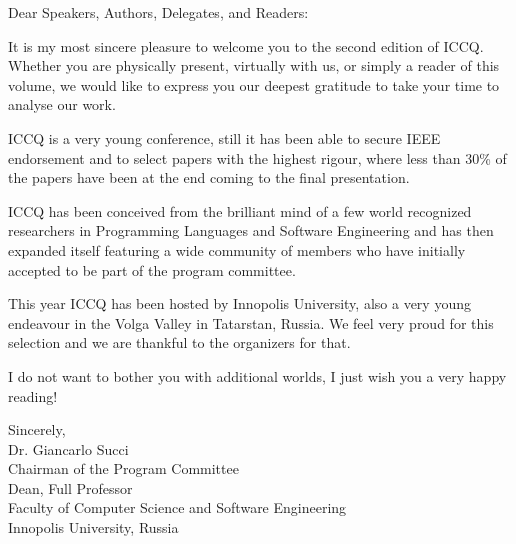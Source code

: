 
\cleardoublepage
{}

Dear Speakers, Authors, Delegates, and Readers:

It is my most sincere pleasure to welcome you to the second edition of ICCQ. Whether you are physically present, virtually with us, or simply a reader of this volume, we would like to express you our deepest gratitude to take your time to analyse our work.

ICCQ is a very young conference, still it has been able to secure IEEE endorsement and to select papers with the highest rigour, where less than 30\% of the papers have been at the end coming to the final presentation.

ICCQ has been conceived from the brilliant mind of a few world recognized researchers in Programming Languages and Software Engineering and has then expanded itself featuring a wide community of members who have initially accepted to be part of the program committee.

This year ICCQ has been hosted by Innopolis University, also a very young endeavour in the Volga Valley in Tatarstan, Russia. We feel very proud for this selection and we are thankful to the organizers for that.

I do not want to bother you with additional worlds, I just wish you a very happy reading!

\vspace{18pt}
Sincerely,\\
Dr. Giancarlo Succi\\
Chairman of the Program Committee \\
Dean, Full Professor\\
Faculty of Computer Science and Software Engineering\\
Innopolis University, Russia
